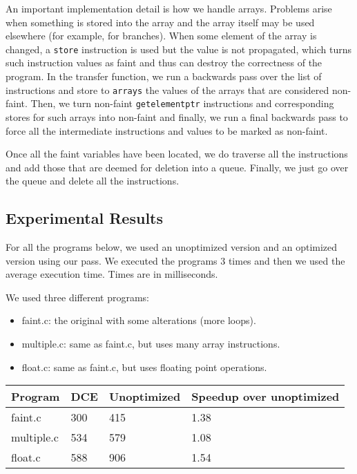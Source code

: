 \documentclass[12pt]{article}
\begin{document}
An important implementation detail is how we handle arrays. Problems arise when something is stored into the array and the array itself may be used elsewhere (for example, for branches). When some element of the array is changed, a \texttt{store} instruction is used but the value is not propagated, which turns such instruction values as faint and thus can destroy the correctness of the program. In the transfer function, we run a backwards pass over the list of instructions and store to \texttt{arrays} the values of the arrays that are considered non-faint. Then, we turn non-faint \texttt{getelementptr} instructions and corresponding
stores for such arrays into non-faint and finally, we run a final backwards pass to force all the intermediate instructions and values to be marked as non-faint.

Once all the faint variables have been located, we do traverse all the instructions and add those that are deemed for deletion into a queue. Finally, we just go over the queue and delete all the instructions.

\subsection{Experimental Results}

For all the programs below, we used an unoptimized version and an optimized version using our pass. We executed the programs 3 times and then we used the average execution time. Times are in milliseconds.

We used three different programs:

\begin{itemize}
   \item faint.c: the original with some alterations (more loops).
   \item multiple.c: same as faint.c, but uses many array instructions.
   \item float.c: same as faint.c, but uses floating point operations.
\end{itemize}

\begin{center}
    \begin{tabular}{ | l | l | l | l |}
    \hline
    Program & DCE & Unoptimized & Speedup over unoptimized \\ \hline
    faint.c & 300 & 415 & 1.38 \\ \hline
    multiple.c & 534 & 579 & 1.08 \\ \hline
    float.c & 588 & 906 & 1.54 \\ \hline
    \hline
    \end{tabular}
\end{center}
\end{document}
